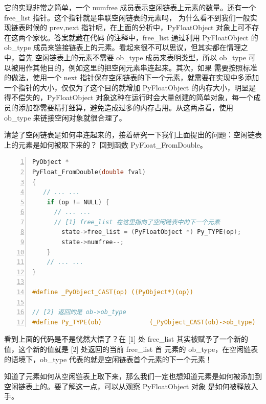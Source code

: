 它的实现非常之简单，一个 numfree 成员表示空闲链表上元素的数量。还有一个 free\_list 指针。这个指针就是串联空闲链表的元素吗，
为什么看不到我们一般实现链表时候的 prev,next 指针呢，在上面的分析中，PyFloatObject 对象上可不存在这两个家伙。答案就藏在代码
的注释中，free\_list 通过利用 PyFloatObject 的 ob\_type 成员来链接链表上的元素。看起来很不可以思议，但其实都在情理之中，首先
空闲链表上的元素不需要 ob\_type 成员来表明类型，所以 ob\_type 可以被用作其他目的，例如这里的把空闲元素串连起来。其次，如果
需要按照标准的做法，使用一个 next 指针保存空闲链表的下一个元素，就需要在实现中多添加一个指针的大小，仅仅为了这个目的就增加
PyFloatObject 的内存大小，明显是得不偿失的，PyFloatObject 对象这种在运行时会大量创建的简单对象，每一个成员的添加都需要精打细算，避免造成过多的内存占用。从这两点看，使用 ob\_type 来链接空闲对象就很合理了。

清楚了空闲链表是如何串连起来的，接着研究一下我们上面提出的问题：空闲链表上的元素是如何被取下来的？
回到函数 PyFloat\_FromDouble。

\begin{lstlisting}[language=C, numbers=left, numbersep=1em, numberstyle=\footnotesize , breaklines=true]
PyObject *
PyFloat_FromDouble(double fval)
{
   // ... ...
    if (op != NULL) {
	  // ... ...
	  // [1] free_list 在这里指向了空闲链表中的下一个元素
        state->free_list = (PyFloatObject *) Py_TYPE(op);
        state->numfree--;
    }
	// ... ...
}

#define _PyObject_CAST(op) ((PyObject*)(op))

// [2] 返回的是 ob->ob_type
#define Py_TYPE(ob)             (_PyObject_CAST(ob)->ob_type)
\end{lstlisting}

看到上面的代码是不是恍然大悟了？在 [1] 处 free\_list 其实被赋予了一个新的值，这个新的值就是 [2] 处返回的当前 free\_list 首
元素的 ob\_type，在空闲链表的语境下，ob\_type 代表的就是空闲链表首个元素的下一个元素！

知道了元素如何从空闲链表上取下来，那么我们一定也想知道元素是如何被添加到空闲链表上的。要了解这一点，可以从观察
PyFloatObject 对象 是如何被释放入手。

